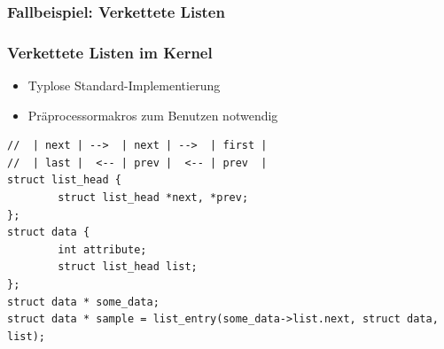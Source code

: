 \documentclass[german]{beamer}
\begin{document}



\subsubsection{Fallbeispiel: Verkettete Listen}
\begin{frame}[fragile]
\frametitle{Verkettete Listen im Kernel}
  \begin{itemize}
	\item Typlose Standard-Implementierung
        \item Präprocessormakros zum Benutzen notwendig
  \end{itemize}
\begin{lstlisting}[frame=single,caption=Linked lists as used in the linux kernel,label=lst:linkedlists]
//  | next | -->  | next | -->  | first | 
//  | last |  <-- | prev |  <-- | prev  |
struct list_head {
        struct list_head *next, *prev;
};
struct data {
        int attribute;
        struct list_head list;
};
struct data * some_data;
struct data * sample = list_entry(some_data->list.next, struct data, list);
\end{lstlisting}
\end{frame}
\end{document}
